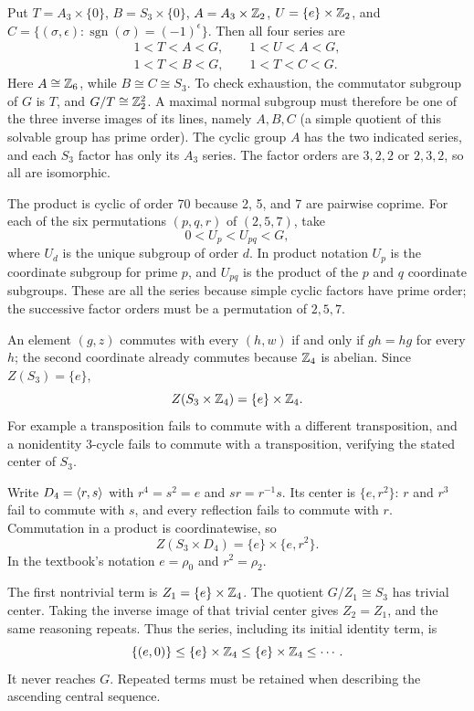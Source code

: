 Put $T=A_3\times\{0\}$, $B=S_3\times\{0\}$,
$A=A_3\times\mathbb{Z}_2$, $U=\{e\}\times\mathbb{Z}_2$, and
$C=\{(\sigma,\epsilon):\operatorname{sgn}(\sigma)=(-1)^\epsilon\}$.
Then all four series are
\[
\begin{gathered}
1<T<A<G,\qquad1<U<A<G,\\
1<T<B<G,\qquad1<T<C<G.
\end{gathered}
\]
Here $A\cong\mathbb{Z}_6$, while $B\cong C\cong S_3$.
To check exhaustion, the commutator subgroup of $G$ is $T$, and $G/T\cong\mathbb{Z}_2^2$. A maximal normal subgroup must therefore be one of the three inverse images of its lines, namely $A,B,C$ (a simple quotient of this solvable group has prime order). The cyclic group $A$ has the two indicated series, and each $S_3$ factor has only its $A_3$ series. The factor orders are $3,2,2$ or $2,3,2$, so all are isomorphic.

The product is cyclic of order 70 because 2, 5, and 7 are pairwise coprime. For each of the six permutations $(p,q,r)$ of $(2,5,7)$, take
\[
0<U_p<U_{pq}<G,
\]
where $U_d$ is the unique subgroup of order $d$.
In product notation $U_p$ is the coordinate subgroup for prime $p$, and $U_{pq}$ is the product of the $p$ and $q$ coordinate subgroups. These are all the series because simple cyclic factors have prime order; the successive factor orders must be a permutation of $2,5,7$.

An element $(g,z)$ commutes with every $(h,w)$ if and only if $gh=hg$ for every $h$; the second coordinate already commutes because $\mathbb{Z}_4$ is abelian. Since $Z(S_3)=\{e\}$,
\[
Z(S_3\times\mathbb{Z}_4)=\{e\}\times\mathbb{Z}_4.
\]
For example a transposition fails to commute with a different transposition, and a nonidentity 3-cycle fails to commute with a transposition, verifying the stated center of $S_3$.

Write $D_4=\langle r,s\rangle$ with $r^4=s^2=e$ and $sr=r^{-1}s$.
Its center is $\{e,r^2\}$: $r$ and $r^3$ fail to commute with $s$, and every reflection fails to commute with $r$.
Commutation in a product is coordinatewise, so
\[
Z(S_3\times D_4)=\{e\}\times\{e,r^2\}.
\]
In the textbook's notation $e=\rho_0$ and $r^2=\rho_2$.

The first nontrivial term is $Z_1=\{e\}\times\mathbb{Z}_4$. The quotient $G/Z_1\cong S_3$ has trivial center. Taking the inverse image of that trivial center gives $Z_2=Z_1$, and the same reasoning repeats. Thus the series, including its initial identity term, is
\[
\{(e,0)\}\le\{e\}\times\mathbb{Z}_4
\le\{e\}\times\mathbb{Z}_4\le\cdots.
\]
It never reaches $G$. Repeated terms must be retained when describing the ascending central sequence.

